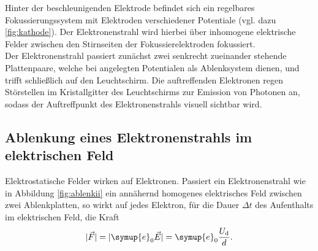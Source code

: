 Hinter der beschleunigenden Elektrode befindet sich ein regelbares Fokussierungssystem mit Elektroden verschiedener Potentiale (vgl. dazu \ref{fig:kathode}).
Der Elektronenstrahl wird hierbei über inhomogene elektrische Felder zwischen den Stirnseiten der Fokussierelektroden fokussiert.\\
Der Elektronenstrahl passiert zunächst zwei senkrecht zueinander stehende Plattenpaare, welche bei angelegten Potentialen als Ablenksystem dienen, und trifft schließlich auf den Leuchtschirm. Die auftreffenden Elektronen regen Störstellen im Kristallgitter des Leuchtschirms zur Emission von Photonen an, sodass der Auftreffpunkt des Elektronenstrahls visuell sichtbar wird.
\subsection{Ablenkung eines Elektronenstrahls im elektrischen Feld}
Elektrostatische Felder wirken auf Elektronen. Passiert ein Elektronenstrahl wie in Abbildung \ref{fig:ablenkii} ein annähernd homogenes elektrisches Feld zwischen zwei Ablenkplatten, so wirkt auf jedes Elektron, für die Dauer $\Delta t$ des Aufenthalts im elektrischen Feld, die Kraft
\begin{equation}
  |\vec{F}|=|\symup{e}_0\vec{E}|=\symup{e}_0\frac{U_\mathrm{d}}{d}\text{.}
\end{equation}

